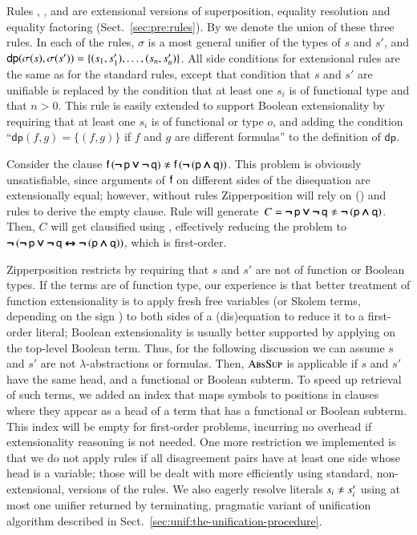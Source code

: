\noindent{}
Rules , , and  are extensional
versions of superposition, equality resolution and equality factoring
(Sect.~\ref{sec:pre:rules}). By  we denote the union of these three
rules. In each of the rules, $\sigma$ is a most general unifier of the types of
$s$ and $s'$, and $\textsf{dp}(\sigma(s) ,\sigma(s')) = \{ (s_1, s'_1), \ldots,
(s_n, s'_n)\}$. All side conditions for extensional rules are the same as for
the standard rules, except that condition that $s$ and $s'$ are unifiable is
replaced by the condition that at least one $s_i$ is of functional type and that
$n>0$. This rule is easily extended to support Boolean extensionality by
requiring that at least one $s_i$ is of functional or type $o$, and adding the
condition ``$\textsf{dp}(f, g) = \{(f,g)\}$ if $f$ and $g$ are different
formulas'' to the definition of $\textsf{dp}$.

Consider the clause $\cst{f} \, (\inot\cst{p} \ior \inot\cst{q}) \noteq \cst{f} \,
(\inot (\cst{p} \iand \cst{q}))$. This problem is obviously unsatisfiable, since
arguments of $\mathsf{f}$ on different sides of the disequation are extensionally
equal; however, without  rules Zipperposition will rely on
() and  rules to derive the empty
clause. Rule  will generate~$C = \inot\cst{p} \ior \inot\cst{q} \noteq
\inot (\cst{p} \iand \cst{q})$. Then, $C$ will get clausified using
, effectively reducing the problem to $\pmb{\neg\,} (\pmb{\neg\,}\mathsf{p} \pmb{\lor}
\pmb{\neg\,}\mathsf{q} \pmb{\leftrightarrow} \pmb{\neg\,} (\mathsf{p} \pmb{\land} \mathsf{q}))$, which is first-order.

Zipperposition restricts  by
requiring that $s$ and $s'$ are not of function or Boolean types. If the terms are of function type, our experience is
that better treatment of function extensionality is to apply fresh free
variables (or Skolem terms, depending on the sign
\cite{bbtvw-21-sup-lam}) to both sides of a (dis)equation to reduce it to
a first-order literal; Boolean extensionality is usually better supported by
applying  on the top-level Boolean term. Thus, for the following
discussion we can assume $s$ and $s'$ are not $\lambda$-abstractions or formulas. Then, $\textsc{AbsSup}$ is applicable if $s$
and $s'$ have the same head, and a functional or Boolean subterm. To speed up
retrieval of such terms, we added an index that maps symbols to positions in
clauses where they appear as a head of a term that has a functional or Boolean
subterm. This index will be empty for first-order problems, incurring no
overhead if extensionality reasoning is not needed. One more restriction we implemented is that we do not apply  rules if all
disagreement pairs have at least one side whose head is a variable; those will
be dealt with more efficiently using standard, non-extensional, versions of the
rules. We also eagerly resolve literals $s_i \not\approx s'_i$ using at most one
unifier returned by terminating, pragmatic variant of unification algorithm described in 
Sect.~\ref{sec:unif:the-unification-procedure}.


